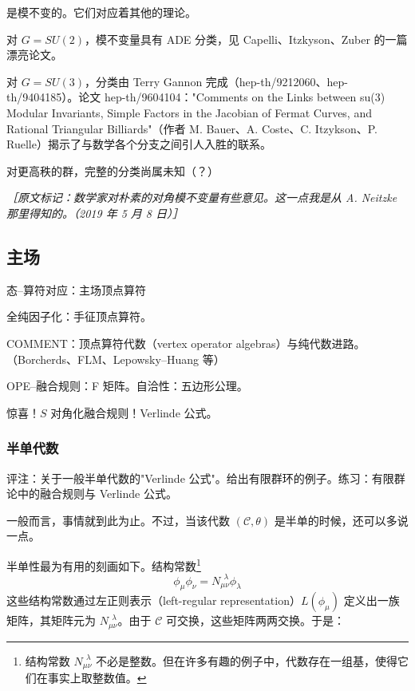 
是模不变的。它们对应着其他的理论。

对 $G=SU(2)$，模不变量具有 ADE 分类，见 Capelli、Itzkyson、Zuber 的一篇漂亮论文。

对 $G=SU(3)$，分类由 Terry Gannon 完成（hep-th/9212060、hep-th/9404185）。论文 hep-th/9604104："Comments on the Links between su(3) Modular Invariants, Simple Factors in the Jacobian of Fermat Curves, and Rational Triangular Billiards"（作者 M. Bauer、A. Coste、C. Itzykson、P. Ruelle）揭示了与数学各个分支之间引人入胜的联系。

对更高秩的群，完整的分类尚属未知（？）

{\small\itshape ［原文标记：数学家对朴素的对角模不变量有些意见。这一点我是从 A. Neitzke 那里得知的。（2019 年 5 月 8 日）］}

\subsection{主场} %

态–算符对应：主场顶点算符

全纯因子化：手征顶点算符。

COMMENT：顶点算符代数（vertex operator algebras）与纯代数进路。（Borcherds、FLM、Lepowsky–Huang 等）

OPE–融合规则：F 矩阵。自洽性：五边形公理。

惊喜！$S$ 对角化融合规则！Verlinde 公式。

\subsubsection{半单代数} %

评注：关于一般半单代数的"Verlinde 公式"。给出有限群环的例子。练习：有限群论中的融合规则与 Verlinde 公式。

一般而言，事情就到此为止。不过，当该代数 $(\mathcal{C},\theta)$ 是半单的时候，还可以多说一点。

半单性最为有用的刻画如下。结构常数\footnote{结构常数 $N_{\mu\nu}^{\ \ \lambda}$ 不必是整数。但在许多有趣的例子中，代数存在一组基，使得它们在事实上取整数值。}
\begin{equation}
  \phi_\mu\phi_\nu=N_{\mu\nu}^{\ \ \lambda}\phi_\lambda
  \tag{4.189}
  \label{eq:4.189}
\end{equation}
这些结构常数通过左正则表示（left-regular representation）$L(\phi_\mu)$ 定义出一族矩阵，其矩阵元为 $N_{\mu\nu}^{\ \ \lambda}$。由于 $\mathcal{C}$ 可交换，这些矩阵两两交换。于是：

